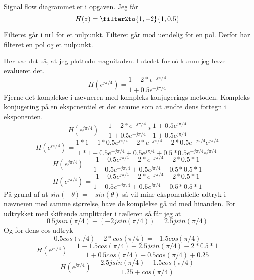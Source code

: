 \begin{rubrik}
    \begin{eksamensOpgave}
        
    \end{eksamensOpgave}
    \begin{eksamensOpgave}
        \begin{UnderOpgave}
            Signal flow diagrammet er i opgaven. Jeg får 
            \[H(z) = \filterZto{1, -2}{1, 0.5}\]            
        \end{UnderOpgave}
        \begin{UnderOpgave}
            Filteret går i nul for et nulpunkt.
            Filteret går mod uendelig for en pol. 
            Derfor har filteret en pol og et nulpunkt.             
        \end{UnderOpgave}
        \begin{UnderOpgave}
            Her var det så, at jeg plottede magnituden. I stedet for så kunne jeg have evalueret det. 
            \[H(e^{j\pi/4}) = \frac{1 - 2*e^{-j\pi/4}}{1 + 0.5e^{-j\pi/4}}\]
            Fjerne det komplekse i nævneren med kompleks konjugerings metoden. Kompleks konjugering på en eksponentiel er det samme som at ændre dens fortegn i eksponenten. 
            \[H(e^{j\pi/4}) = \frac{1 - 2*e^{-j\pi/4}}{1 + 0.5e^{-j\pi/4}} * \frac{1 + 0.5e^{j\pi/4}}{1 + 0.5e^{j\pi/4}}\]
            \[H(e^{j\pi/4}) = \frac{1*1 + 1*0.5e^{j\pi/4} - 2*e^{-j\pi/4} - 2*0.5e^{-j\pi/4}e^{j\pi/4}}{1*1 + 0.5e^{-j\pi/4} + 0.5e^{j\pi/4} + 0.5*0.5e^{-j\pi/4}e^{j\pi/4}}\]
            \[H(e^{j\pi/4}) = \frac{1 + 0.5e^{j\pi/4} - 2*e^{-j\pi/4} - 2*0.5*1}{1 + 0.5e^{-j\pi/4} + 0.5e^{j\pi/4} + 0.5*0.5*1}\]
            \[H(e^{j\pi/4}) = \frac{1 + 0.5e^{j\pi/4} - 2*e^{-j\pi/4} - 2*0.5*1}{1 + 0.5e^{-j\pi/4} + 0.5e^{j\pi/4} + 0.5*0.5*1}\]
            På grund af at $sin(-\theta) = -sin(\theta)$ så vil mine eksponentielle udtryk i nævneren med samme størrelse, have de komplekse gå ud med hinanden. 
            For udtrykket med skiftende amplituder i tælleren så får jeg at
            \[0.5jsin(\pi/4) - (-2jsin(\pi/4)) = 2.5jsin(\pi/4)\]
            Og for dens cos udtryk
            \[0.5cos(\pi/4) - 2*cos(\pi/4) = - 1.5cos(\pi/4)\]
            \[H(e^{j\pi/4}) = \frac{1 - 1.5cos(\pi/4) + 2.5jsin(\pi/4)- 2*0.5*1}{1 + 0.5cos(\pi/4) + 0.5cos(\pi/4) + 0.25}\]
            \[H(e^{j\pi/4}) = \frac{2.5jsin(\pi/4) - 1.5cos(\pi/4)}{1.25 + cos(\pi/4)}\] 

\end{UnderOpgave}
\end{eksamensOpgave}
\end{rubrik}
